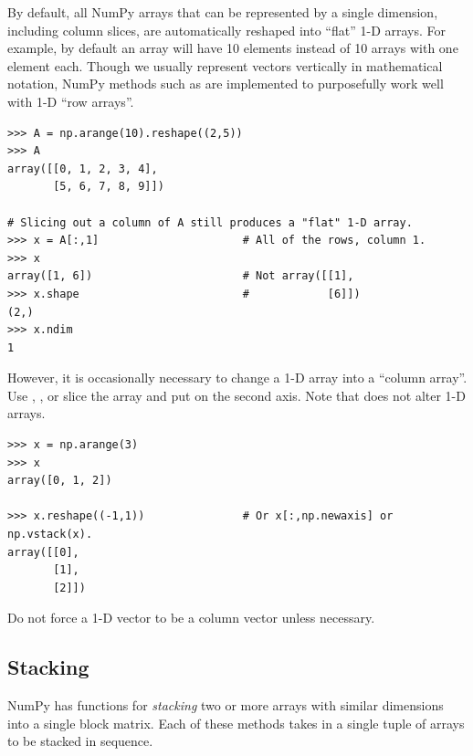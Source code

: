\begin{info} %
By default, all NumPy arrays that can be represented by a single dimension, including column slices, are automatically reshaped into ``flat'' 1-D arrays.
For example, by default an array will have 10 elements instead of 10 arrays with one element each.
Though we usually represent vectors vertically in mathematical notation, NumPy methods such as  are implemented to purposefully work well with 1-D ``row arrays''.

\begin{lstlisting}
>>> A = np.arange(10).reshape((2,5))
>>> A
array([[0, 1, 2, 3, 4],
       [5, 6, 7, 8, 9]])

# Slicing out a column of A still produces a "flat" 1-D array.
>>> x = A[:,1]                      # All of the rows, column 1.
>>> x
array([1, 6])                       # Not array([[1],
>>> x.shape                         #            [6]])
(2,)
>>> x.ndim
1
\end{lstlisting}

However, it is occasionally necessary to change a 1-D array into a ``column array''.
Use , , or slice the array and put  on the second axis.
Note that  does not alter 1-D arrays.

\begin{lstlisting}
>>> x = np.arange(3)
>>> x
array([0, 1, 2])

>>> x.reshape((-1,1))               # Or x[:,np.newaxis] or np.vstack(x).
array([[0],
       [1],
       [2]])
\end{lstlisting}

Do not force a 1-D vector to be a column vector unless necessary.
\end{info}

\subsection*{Stacking} %

NumPy has functions for \emph{stacking} two or more arrays with similar dimensions into a single block matrix.
Each of these methods takes in a single tuple of arrays to be stacked in sequence.

